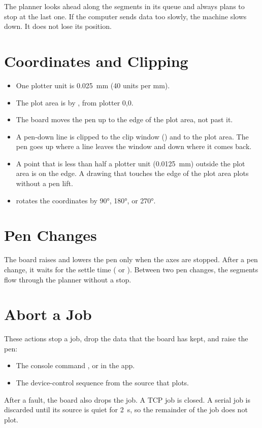 The planner looks ahead along the segments in its queue and always plans to
stop at the last one. If the computer sends data too slowly, the machine
slows down. It does not lose its position.

\section{Coordinates and Clipping}

\begin{itemize}
  \item One plotter unit is \SI{0.025}{mm} (40 units per mm).
  \item The plot area is  by , from plotter 0,0.
  \item The board moves the pen up to the edge of the plot area, not past it.
  \item A pen-down line is clipped to the clip window () and to the
        plot area. The pen goes up where a line leaves the window and down
        where it comes back.
  \item A point that is less than half a plotter unit (\SI{0.0125}{mm})
        outside the plot area is on the edge. A drawing that touches the edge
        of the plot area plots without a pen lift.
  \item {} rotates the coordinates by 90°, 180°, or 270°.
\end{itemize}

\section{Pen Changes}

The board raises and lowers the pen only when the axes are stopped. After a
pen change, it waits for the settle time ( or
). Between two pen changes, the segments flow through the
planner without a stop.

\section{Abort a Job}

These actions stop a job, drop the data that the board has kept, and raise
the pen:

\begin{itemize}
  \item The console command , or  in the app.
  \item The device-control sequence  from the source that plots.
\end{itemize}

After a fault, the board also drops the job. A TCP job is closed. A serial
job is discarded until its source is quiet for 2~s, so the remainder of the
job does not plot.
